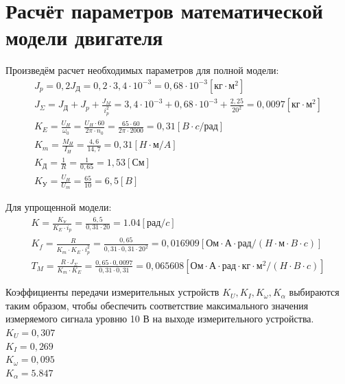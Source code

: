 \documentclass[a4paper,12pt]{article} %
\begin{document}
\newpage
\section{Расчёт параметров математической модели двигателя}

Произведём расчет необходимых параметров для полной модели:
\begin{gather}
    J_p = 0,2J_\text{Д} = 0,2 \cdot 3,4\cdot10^{-3} = 0,68\cdot10^{-3} [\text{кг}\cdot\text{м}^2]\\
    J_\Sigma = J_\text{Д} + J_p + \frac{J_M}{i_p^2} = 3,4\cdot10^{-3} + 0,68\cdot10^{-3} + \frac{2,25}{20^2} = 0,0097 [\text{кг}\cdot\text{м}^2]\\
    K_E = \frac{U_H}{\omega_0} = \frac{U_H\cdot60}{2\pi\cdot n_0} = \frac{65\cdot60}{2\pi\cdot2000} = 0,31 [B\cdot c/\text{рад}]\\
    K_m = \frac{M_H}{I_H} = \frac{4,6}{14,7} = 0,31 [H\cdot\text{м}/A]\\
    K_\text{Д} = \frac{1}{R} = \frac{1}{0,65} = 1,53 [\text{См}]\\
    K_\text{У} = \frac{U_H}{U_m} = \frac{65}{10} = 6,5 [B]
\end{gather}
\par
Для упрощенной модели:
\begin{gather}
	K = \frac{K_\text{У}}{K_E\cdot i_p} = \frac{6,5}{0,31 \cdot 20} = 1.04 [\text{рад}/c]\\
	K_f = \frac{R}{K_m\cdot K_E\cdot i_p^2} = \frac{0,65}{0,31\cdot0,31\cdot20^2} = 0,016909 [\text{Ом$\cdot$А$\cdot$рад}/(H\cdot\text{м}\cdot B\cdot c)]\\
	T_M = \frac{R\cdot J_\Sigma}{K_m\cdot K_E} = \frac{0,65\cdot0,0097}{0,31\cdot0,31} = 0,065608[\text{Ом$\cdot$А$\cdot$рад$\cdot$кг$\cdot$м$^2$}/(H\cdot B \cdot c)]
\end{gather}
\par
Коэффициенты передачи измерительных устройств $K_U, K_I, K_\omega, K_\alpha$ выбираются таким образом, чтобы обеспечить соответствие максимального значения измеряемого сигнала уровню 10 В на выходе измерительного устройства.\\ 
$K_U = 0,307$\\
$K_I = 0,269$\\
$K_\omega = 0,095$\\
$K_\alpha = 5.847$


\newpage
\end{document}
